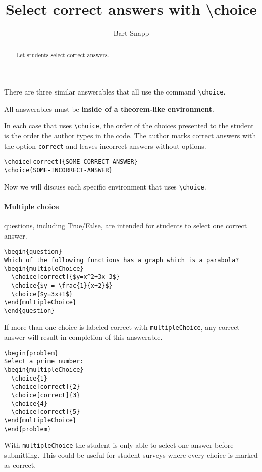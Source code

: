 \documentclass{ximera}
\title{Select correct answers with \textbackslash choice}
\author{Bart Snapp}
\begin{document}
\begin{abstract}
  Let students select correct answers.
\end{abstract}
\maketitle


There are three similar answerables that all use the command \verb!\choice!. 

\begin{warning}
  All answerables must be \textbf{inside of a theorem-like environment}.
\end{warning}


In each case that uses \verb!\choice!, the order of the choices presented to the student is the order the
author types in the code. The author marks correct answers with the option
\verb!correct! and leaves incorrect answers without options.
\begin{verbatim}
\choice[correct]{SOME-CORRECT-ANSWER}
\choice{SOME-INCORRECT-ANSWER}
\end{verbatim}
Now we will discuss each specific environment that uses \verb!\choice!.
\paragraph{Multiple choice}
questions, including True/False, are intended for students to select one 
correct answer.
\begin{verbatim}
\begin{question}
Which of the following functions has a graph which is a parabola?
\begin{multipleChoice}
  \choice[correct]{$y=x^2+3x-3$}
  \choice{$y = \frac{1}{x+2}$}
  \choice{$y=3x+1$}
\end{multipleChoice}
\end{question}
\end{verbatim}
If more than one choice is labeled correct with \verb!multipleChoice!, any
correct answer will result in completion of this answerable.
\begin{verbatim}
\begin{problem}
Select a prime number:
\begin{multipleChoice}
  \choice{1}
  \choice[correct]{2}
  \choice[correct]{3}
  \choice{4}
  \choice[correct]{5}
\end{multipleChoice}
\end{problem}
\end{verbatim}
With \verb!multipleChoice! the student is only able to select one answer before
submitting. This could be useful for student surveys where every choice is
marked as correct.
\end{document}
